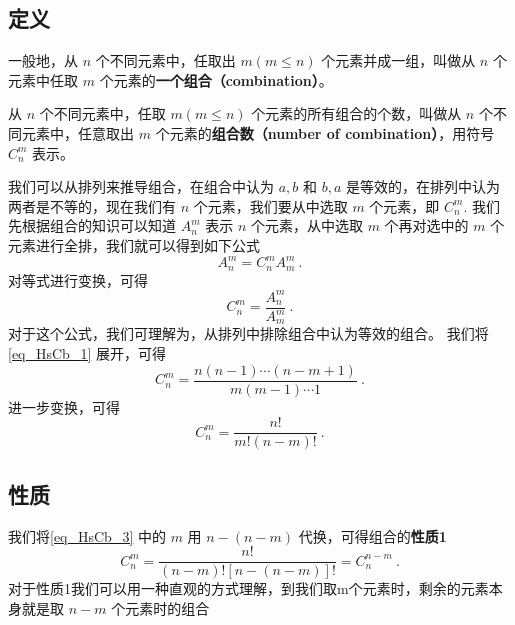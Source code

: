 

\subsection{定义}
一般地，从 $n$ 个不同元素中，任取出 $m(m\leq n)$ 个元素并成一组，叫做从 $n$ 个元素中任取 $m$ 个元素的\textbf{一个组合（combination）}。

从 $n$ 个不同元素中，任取 $m(m\leq n)$ 个元素的所有组合的个数，叫做从 $n$ 个不同元素中，任意取出 $m$ 个元素的\textbf{组合数（number of combination）}，用符号 $C_n^m$ 表示。

我们可以从排列来推导组合，在组合中认为 ${a,b}$ 和 ${b,a}$ 是等效的，在排列中认为两者是不等的，现在我们有 $n$ 个元素，我们要从中选取 $m$ 个元素，即 $C_n^m$.
我们先根据组合的知识可以知道 $A_n^m$ 表示 $n$ 个元素，从中选取 $m$ 个再对选中的 $m$ 个元素进行全排，我们就可以得到如下公式
\begin{equation}
A_n^m = C_n^m A_m^m~.
\end{equation}
对等式进行变换，可得
\begin{equation}\label{eq_HsCb_1}
C_n^m = \frac {A_n^m}{A_m^m}~.
\end{equation}
对于这个公式，我们可理解为，从排列中排除组合中认为等效的组合。
我们将\autoref{eq_HsCb_1} 展开，可得
\begin{equation}\label{eq_HsCb_2} 
C_n^m = \frac{n(n -1) \cdots(n -m + 1)}{m(m-1)\cdots 1}~.
\end{equation}
进一步变换，可得
\begin{equation}\label{eq_HsCb_3}
C_n^m = \frac{n!}{m!(n-m)!}~.
\end{equation}

\subsection{性质}

我们将\autoref{eq_HsCb_3} 中的 $m$ 用 $n-(n-m) $ 代换，可得组合的\textbf{性质1}
\begin{equation}
C_n^m = \frac{n!}{(n -m)![n-(n-m)]!} = C_n^{n-m}~.
\end{equation}
对于性质1我们可以用一种直观的方式理解，到我们取m个元素时，剩余的元素本身就是取 $n-m$ 个元素时的组合

